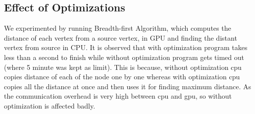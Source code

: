 \documentclass[12pt]{article}
\begin{document}
\subsection{Effect of Optimizations}\label{expt:optimizations}
We experimented by running Breadth-first Algorithm, which computes the distance of each vertex from a source vertex, in GPU and finding the distant vertex from source in CPU. It is observed that with optimization program takes less than a second to finish while without optimization program gets timed out (where 5 minute was kept as limit). This is because, without optimization cpu copies distance of each of the node one by one whereas with optimization cpu copies all the distance at once and then uses it for finding maximum distance. As the communication overhead is very high between cpu and gpu, so without optimization is affected badly.
\end{document}
